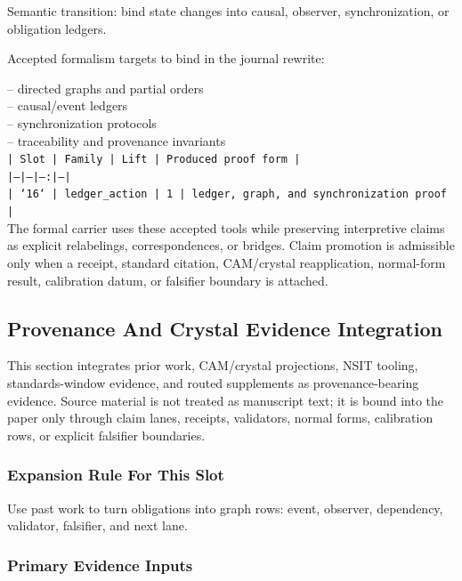 \documentclass[11pt]{article}
\begin{document}
Semantic transition: bind state changes into causal, observer, synchronization, or obligation ledgers.

Accepted formalism targets to bind in the journal rewrite:

\noindent{}-- directed graphs and partial orders\\
\noindent{}-- causal/event ledgers\\
\noindent{}-- synchronization protocols\\
\noindent{}-- traceability and provenance invariants\\

\noindent\texttt{| Slot | Family | Lift | Produced proof form |}\\
\noindent\texttt{|---|---|---:|---|}\\
\noindent\texttt{| `16` | ledger\_action | 1 | ledger, graph, and synchronization proof |}\\

The formal carrier uses these accepted tools while preserving interpretive
claims as explicit relabelings, correspondences, or bridges. Claim promotion is admissible only when a receipt, standard citation,
CAM/crystal reapplication, normal-form result, calibration datum, or falsifier
boundary is attached.

\subsection*{Provenance And Crystal Evidence Integration}

This section integrates prior work, CAM/crystal projections, NSIT tooling,
standards-window evidence, and routed supplements as provenance-bearing
evidence. Source material is not treated as manuscript text; it is bound into
the paper only through claim lanes, receipts, validators, normal forms,
calibration rows, or explicit falsifier boundaries.

\subsubsection*{Expansion Rule For This Slot}

Use past work to turn obligations into graph rows: event, observer, dependency, validator, falsifier, and next lane.

\subsubsection*{Primary Evidence Inputs}
\end{document}
